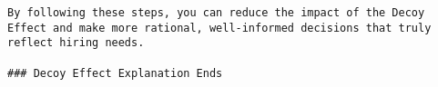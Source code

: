 \begin{verbatim}
By following these steps, you can reduce the impact of the Decoy Effect and make more rational, well-informed decisions that truly reflect hiring needs.

### Decoy Effect Explanation Ends
\end{verbatim}
